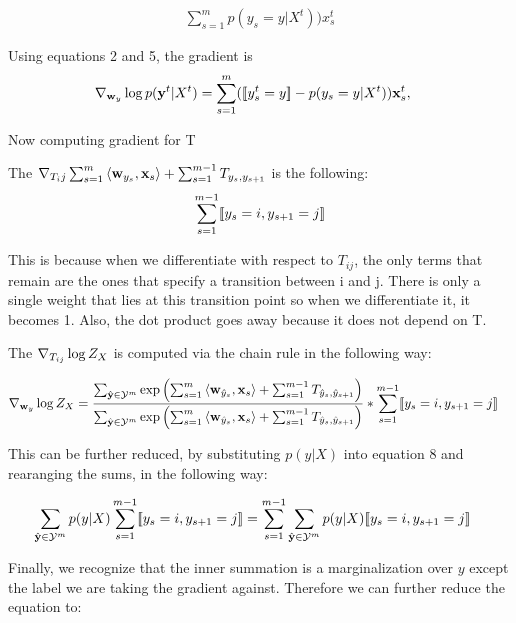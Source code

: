 \documentclass[11pt]{report}
\begin{document}
	\begin{align}
	 \sum_{s=1}^m {p(y_s=y | X^t))}x_s^t
	\end{align}

	Using equations 2 and 5, the gradient is 
	\begin{align}
		{\nabla}_{\mathbf{\boldsymbol{w}}_y} \log p(\mathbf{\boldsymbol{y}}^t|X^t) &= \sum_{s=1}^m ([\![y^t_s = y]\!] - p(y_s = y | X^t)) \mathbf{\boldsymbol{x}}^t_s,
	\end{align}
	


	Now computing gradient for T


	The ${\nabla}_{T_ij} \sum_{s=1}^m \left\langle \mathbf{\boldsymbol{w}}_{y_s},\mathbf{\boldsymbol{x}}_s \right\rangle + \sum_{s=1}^{m-1} T_{y_s, y_{s+1}}$ is the following:
	\begin{align}
	\sum_{s=1}^{m-1} [\![y_s = i, y_{s+1} = j]\!]
	\end{align}

	This is because when we differentiate with respect to $T_{ij}$, the only terms that remain are the ones that specify a transition between i and j. There is only a single weight that lies at this transition point so when we differentiate it, it becomes 1. Also, the dot product goes away because it does not depend on T.

	The ${\nabla}_{T_{ij}} \log Z_X$ is computed via the chain rule in the following way:

	\begin{align}
	{\nabla}_{\mathbf{\boldsymbol{w}}_y} \log Z_X &= \frac{ \sum_{\hat{\mathbf{\boldsymbol{y}}} \in \mathcal{Y}^m} \exp \left(\sum_{s=1}^m \left\langle \mathbf{\boldsymbol{w}}_{\hat{y}_s},\mathbf{\boldsymbol{x}}_s \right\rangle + \sum_{s=1}^{m-1} T_{\hat{y}_s, \hat{y}_{s+1}}\right) }
	{\sum_{\hat{\mathbf{\boldsymbol{y}}} \in \mathcal{Y}^m} \exp \left(\sum_{s=1}^m \left\langle \mathbf{\boldsymbol{w}}_{\hat{y}_s},\mathbf{\boldsymbol{x}}_s \right\rangle + \sum_{s=1}^{m-1} T_{\hat{y}_s, \hat{y}_{s+1}}\right)} * \sum_{s=1}^{m-1} [\![y_s = i, y_{s+1} = j]\!]
	\end{align}


	This can be further reduced, by substituting $p(y|X)$ into equation 8 and rearanging the sums, in the following way:

	\begin{align}
	\sum_{\hat{\mathbf{\boldsymbol{y}}} \in \mathcal{Y}^m} p(y|X) \sum_{s=1}^{m-1} [\![y_s = i, y_{s+1} = j]\!] &= \sum_{s=1}^{m-1}  \sum_{\hat{\mathbf{\boldsymbol{y}}} \in \mathcal{Y}^m}   p(y|X)[\![y_s = i, y_{s+1} = j]\!]
	\end{align}


	Finally, we recognize that the inner summation is a marginalization over $y$ except the label we are taking the gradient against. Therefore we can further reduce the equation to:
\end{document}
